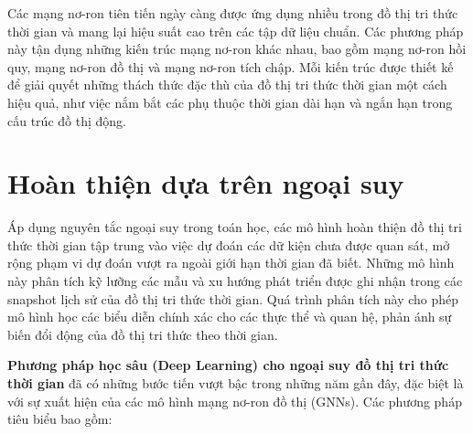 Các mạng nơ-ron tiên tiến ngày càng được ứng dụng nhiều trong đồ thị tri thức thời gian và mang lại hiệu suất cao trên các tập dữ liệu chuẩn. Các phương pháp này tận dụng những kiến trúc mạng nơ-ron khác nhau, bao gồm mạng nơ-ron hồi quy, mạng nơ-ron đồ thị và mạng nơ-ron tích chập. Mỗi kiến trúc được thiết kế để giải quyết những thách thức đặc thù của đồ thị tri thức thời gian một cách hiệu quả, như việc nắm bắt các phụ thuộc thời gian dài hạn và ngắn hạn trong cấu trúc đồ thị động.

\section{Hoàn thiện dựa trên ngoại suy}

Áp dụng nguyên tắc ngoại suy trong toán học, các mô hình hoàn thiện đồ thị tri thức thời gian tập trung vào việc dự đoán các dữ kiện chưa được quan sát, mở rộng phạm vi dự đoán vượt ra ngoài giới hạn thời gian đã biết. Những mô hình này phân tích kỹ lưỡng các mẫu và xu hướng phát triển được ghi nhận trong các snapshot lịch sử của đồ thị tri thức thời gian. Quá trình phân tích này cho phép mô hình học các biểu diễn chính xác cho các thực thể và quan hệ, phản ánh sự biến đổi động của đồ thị tri thức theo thời gian.

\textbf{Phương pháp học sâu (Deep Learning) cho ngoại suy đồ thị tri thức thời gian} đã có những bước tiến vượt bậc trong những năm gần đây, đặc biệt là với sự xuất hiện của các mô hình mạng nơ-ron đồ thị (GNNs). Các phương pháp tiêu biểu bao gồm:

